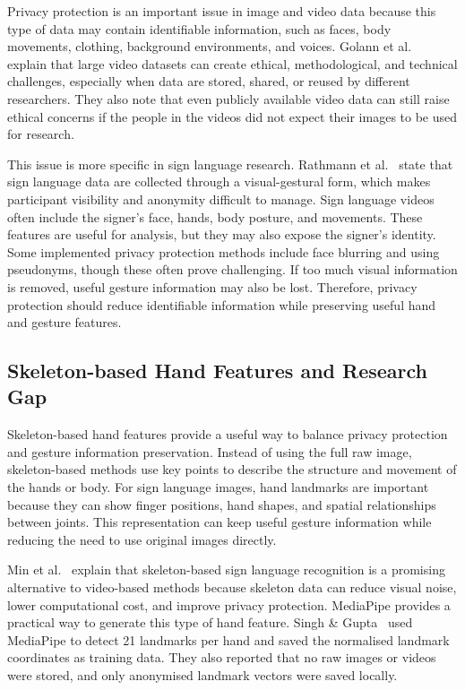 \documentclass[conference]{IEEEtran}
\begin{document}
Privacy protection is an important issue in image and video data because this type of data may contain identifiable information, such as faces, body movements, clothing, background environments, and voices. Golann et al.~\cite{golann2026} explain that large video datasets can create ethical, methodological, and technical challenges, especially when data are stored, shared, or reused by different researchers. They also note that even publicly available video data can still raise ethical concerns if the people in the videos did not expect their images to be used for research.

This issue is more specific in sign language research. Rathmann et al.~\cite{rathmann2025} state that sign language data are collected through a visual-gestural form, which makes participant visibility and anonymity difficult to manage. Sign language videos often include the signer's face, hands, body posture, and movements. These features are useful for analysis, but they may also expose the signer's identity. Some implemented privacy protection methods include face blurring and using pseudonyms, though these often prove challenging. If too much visual information is removed, useful gesture information may also be lost. Therefore, privacy protection should reduce identifiable information while preserving useful hand and gesture features.

\subsection{Skeleton-based Hand Features and Research Gap}

Skeleton-based hand features provide a useful way to balance privacy protection and gesture information preservation. Instead of using the full raw image, skeleton-based methods use key points to describe the structure and movement of the hands or body. For sign language images, hand landmarks are important because they can show finger positions, hand shapes, and spatial relationships between joints. This representation can keep useful gesture information while reducing the need to use original images directly.

Min et al.~\cite{min2025skeleton} explain that skeleton-based sign language recognition is a promising alternative to video-based methods because skeleton data can reduce visual noise, lower computational cost, and improve privacy protection. MediaPipe provides a practical way to generate this type of hand feature. Singh \& Gupta~\cite{singh2026} used MediaPipe to detect 21 landmarks per hand and saved the normalised landmark coordinates as training data. They also reported that no raw images or videos were stored, and only anonymised landmark vectors were saved locally.
\end{document}
